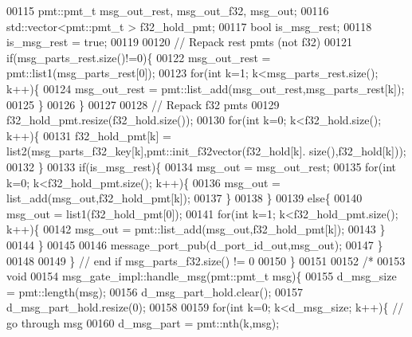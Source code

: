 \begin{DoxyCode}
00115             pmt::pmt\_t msg\_out\_rest, msg\_out\_f32, msg\_out;
00116             std::vector<pmt::pmt\_t > f32\_hold\_pmt;
00117             \textcolor{keywordtype}{bool} is\_msg\_rest;
00118             is\_msg\_rest = \textcolor{keyword}{true};
00119             
00120             \textcolor{comment}{// Repack rest pmts (not f32)}
00121             \textcolor{keywordflow}{if}(msg\_parts\_rest.size()!=0)\{
00122                 msg\_out\_rest = pmt::list1(msg\_parts\_rest[0]);
00123                 \textcolor{keywordflow}{for}(\textcolor{keywordtype}{int} k=1; k<msg\_parts\_rest.size(); k++)\{
00124                     msg\_out\_rest = pmt::list\_add(msg\_out\_rest,msg\_parts\_rest[k]);
00125                 \}
00126             \}
00127             
00128             \textcolor{comment}{// Repack f32 pmts}
00129             f32\_hold\_pmt.resize(f32\_hold.size());
00130             \textcolor{keywordflow}{for}(\textcolor{keywordtype}{int} k=0; k<f32\_hold.size(); k++)\{
00131                 f32\_hold\_pmt[k] = list2(msg\_parts\_f32\_key[k],pmt::init\_f32vector(f32\_hold[k].
      size(),f32\_hold[k]));
00132             \}
00133             \textcolor{keywordflow}{if}(is\_msg\_rest)\{
00134                 msg\_out = msg\_out\_rest;
00135                 \textcolor{keywordflow}{for}(\textcolor{keywordtype}{int} k=0; k<f32\_hold\_pmt.size(); k++)\{
00136                     msg\_out = list\_add(msg\_out,f32\_hold\_pmt[k]);
00137                 \}
00138             \}
00139             \textcolor{keywordflow}{else}\{
00140                 msg\_out = list1(f32\_hold\_pmt[0]);
00141                 \textcolor{keywordflow}{for}(\textcolor{keywordtype}{int} k=1; k<f32\_hold\_pmt.size(); k++)\{
00142                     msg\_out = pmt::list\_add(msg\_out,f32\_hold\_pmt[k]);
00143                 \}
00144             \}
00145         
00146             message\_port\_pub(d_port_id_out,msg\_out);
00147         \}
00148         
00149         \} \textcolor{comment}{// end if msg\_parts\_f32.size() != 0}
00150     \}
00151     
00152     \textcolor{comment}{/*}
00153 \textcolor{comment}{    void}
00154 \textcolor{comment}{    msg\_gate\_impl::handle\_msg(pmt::pmt\_t msg)\{}
00155 \textcolor{comment}{        d\_msg\_size = pmt::length(msg);}
00156 \textcolor{comment}{        d\_msg\_part\_hold.clear();}
00157 \textcolor{comment}{        d\_msg\_part\_hold.resize(0);}
00158 \textcolor{comment}{        }
00159 \textcolor{comment}{        for(int k=0; k<d\_msg\_size; k++)\{ // go through msg}
00160 \textcolor{comment}{            d\_msg\_part = pmt::nth(k,msg);}

\end{DoxyCode}

